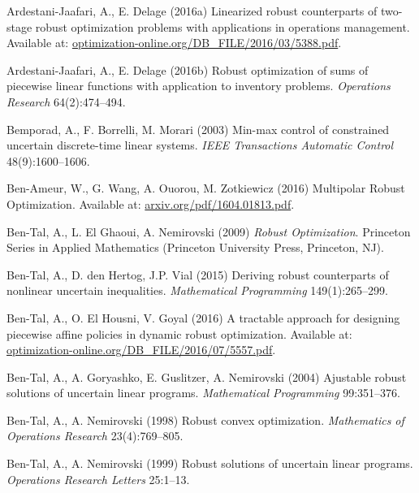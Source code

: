 \documentclass[fleqn,mnsc,blindrev]{informs4}
\begin{document}
\begin{thebibliography}{}%
			Ardestani-Jaafari, A., E. Delage (2016a)
			Linearized robust counterparts of two-stage robust optimization problems with applications in operations management. Available at: { \url{optimization-online.org/DB_FILE/2016/03/5388.pdf}}.
						
			Ardestani-Jaafari, A., E. Delage (2016b)
			Robust optimization of sums of piecewise linear functions with application to inventory problems.  {\it Operations Research} 64(2):474--494.

			Bemporad, A., F. Borrelli, M. Morari (2003)
			Min-max control of constrained uncertain discrete-time linear systems.
			{\it IEEE Transactions Automatic Control} 48(9):1600--1606.	
			
			Ben-Ameur, W., G. Wang, A. Ouorou, M. Zotkiewicz  (2016)
			Multipolar Robust Optimization. Available at: { \url{arxiv.org/pdf/1604.01813.pdf}}.	
			
						
			Ben-Tal, A., L. El Ghaoui,   A. Nemirovski (2009)
			{\it Robust Optimization}.
			Princeton Series in Applied Mathematics (Princeton University Press, Princeton, NJ).

			Ben-Tal, A., D. den Hertog, J.P. Vial (2015)
			Deriving robust counterparts of nonlinear uncertain inequalities.
			{\it Mathematical Programming} 149(1):265--299.
			

			Ben-Tal, A., O. El Housni, V. Goyal (2016)
			A tractable approach for designing piecewise affine policies in dynamic robust optimization. Available at: \url{optimization-online.org/DB_FILE/2016/07/5557.pdf}.
			
						
			Ben-Tal, A., A. Goryashko, E. Guslitzer, A. Nemirovski (2004)
			Ajustable robust solutions of uncertain linear programs. {\it Mathematical Programming} 99:351--376.
			
			Ben-Tal, A., A. Nemirovski (1998)
			Robust convex optimization. {\it Mathematics of Operations Research} 23(4):769--805.
			
			Ben-Tal, A., A. Nemirovski (1999)
			Robust solutions of uncertain linear programs. {\it Operations Research Letters} 25:1--13.
			

\end{thebibliography}
\end{document}
